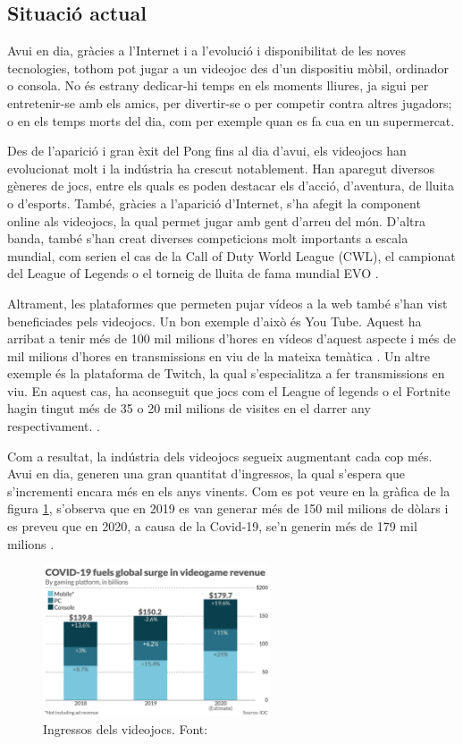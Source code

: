 \documentclass[a4paper]{article}
\begin{document}
\subsection{Situació actual}
Avui en dia, gràcies a l'Internet i a l'evolució i disponibilitat de les noves tecnologies, tothom pot jugar a un videojoc des d'un dispositiu mòbil, ordinador o consola. No és estrany dedicar-hi temps en els moments lliures, ja sigui per entretenir-se amb els amics, per divertir-se o per competir contra altres jugadors; o en els temps morts del dia, com per exemple quan es fa cua en un supermercat. 

Des de l'aparició i gran èxit del Pong fins al dia d'avui, els videojocs han evolucionat molt i la indústria ha crescut notablement. Han aparegut diversos gèneres de jocs, entre els quals es poden destacar els d'acció, d'aventura, de lluita o d'esports. També, gràcies a l'aparició d'Internet, s'ha afegit la component online als videojocs, la qual permet jugar amb gent d'arreu del món. D'altra banda, també s'han creat diverses competicions molt importants a escala mundial, com serien el cas de la Call of Duty World League (CWL), el campionat del League of Legends \cite{importantCompetitions}  o el torneig de lluita de fama mundial EVO \cite{wikipediaEVO}.

Altrament, les plataformes que permeten pujar vídeos a la web també \mbox{s'han} vist beneficiades pels videojocs. Un bon exemple d'això és You Tube. Aquest ha arribat a tenir més de 100 mil milions d'hores en vídeos d'aquest aspecte i més de mil milions d'hores en transmissions en viu de la mateixa temàtica \cite{visitesYT}. Un altre exemple és la plataforma de Twitch, la qual s'especialitza a fer transmissions en viu. En aquest cas, ha aconseguit que jocs com el League of legends o el Fortnite hagin tingut més de 35 o 20 mil milions de visites en el darrer any respectivament. \cite{visitesTwitch}.

Com a resultat, la indústria dels videojocs segueix augmentant cada cop més. Avui en dia, generen una gran quantitat d'ingressos, la qual s'espera que s'incrementi encara més en els anys vinents. Com es pot veure en la gràfica de la figura \ref{fig:VideogamesRevenuesImage}, s'observa que en 2019 es van generar més de 150 mil milions de dòlars i es preveu que en 2020, a causa de la Covid-19, se'n generin més de 179 mil milions \cite{VidogamesMoreMoney}.

\begin{figure}[H]
    \centering
    \includegraphics[width=0.6\textwidth]{images/videogamesMoney.jpeg}
    \caption[Ingressos dels videojocs]{Ingressos dels videojocs. Font: \cite{VidogamesMoreMoney}}
    \label{fig:VideogamesRevenuesImage}
\end{figure}
\end{document}
